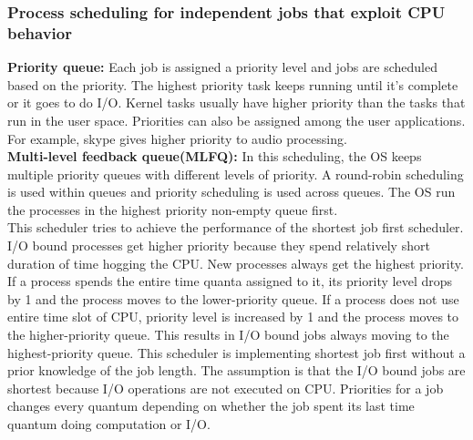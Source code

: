 \documentclass[twoside]{article}
\begin{document}
\subsubsection{Process scheduling for independent jobs that exploit CPU behavior }
\textbf{Priority queue:} Each job is assigned a priority level and jobs are scheduled based on the priority. The highest priority task keeps running until it's complete or it goes to do I/O. Kernel tasks usually have higher priority than the tasks that run in the user space. Priorities can also be assigned among the user applications. For example, skype gives higher priority to audio processing.\\
\textbf{Multi-level feedback queue(MLFQ):} In this scheduling, the OS keeps multiple priority queues with different levels of priority. A round-robin scheduling is used within queues and priority scheduling is used across queues. The OS run the processes in the highest priority non-empty queue first.\\
This scheduler tries to achieve the performance of the shortest job first scheduler. I/O bound processes get higher priority because they spend relatively short duration of time hogging the CPU. New processes always get the highest priority. If a process spends the entire time quanta assigned to it, its priority level drops by 1 and the process moves to the lower-priority queue. If a process does not use entire time slot of CPU, priority level is increased by 1 and the process moves to the higher-priority queue. This results in I/O bound jobs always moving to the highest-priority queue. This scheduler is implementing shortest job first without a prior knowledge of the job length. The assumption is that the I/O bound jobs are shortest because I/O operations are not executed on CPU. Priorities for a job changes every quantum depending on whether the job spent its last time quantum doing computation or I/O. \\
\end{document}
